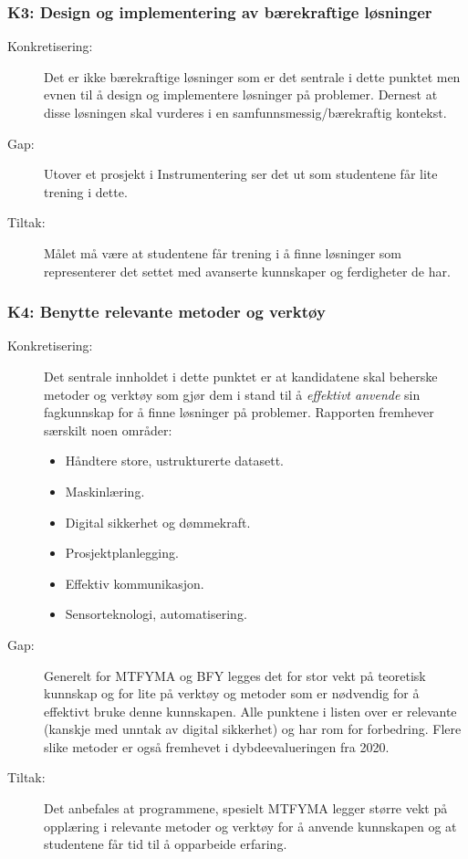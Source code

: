 \subsubsection{K3: Design og implementering av bærekraftige løsninger}
\begin{description}
\item[Konkretisering:]Det er ikke bærekraftige løsninger som er det sentrale i dette punktet men evnen til å design og implementere løsninger på problemer. Dernest at disse løsningen skal vurderes i en samfunnsmessig/bærekraftig kontekst.
\item[Gap:]Utover et prosjekt i Instrumentering ser det ut som studentene får lite trening i dette.
\item[Tiltak:]Målet må være at studentene får trening i å finne løsninger som representerer det settet med avanserte kunnskaper og ferdigheter de har.
\end{description}

\subsubsection{K4: Benytte relevante metoder og verktøy}
\begin{description}
\item[Konkretisering:] Det sentrale innholdet i dette punktet er at kandidatene skal beherske metoder og verktøy som gjør dem i stand til å \emph{effektivt anvende} sin fagkunnskap for å finne løsninger på problemer. Rapporten fremhever særskilt noen områder:
\begin{itemize}
	\item Håndtere store, ustrukturerte datasett.
	\item Maskinlæring.
	\item Digital sikkerhet og dømmekraft.
	\item Prosjektplanlegging.
	\item Effektiv kommunikasjon.
	\item Sensorteknologi, automatisering.
\end{itemize}

\item[Gap:]Generelt for MTFYMA og BFY legges det for stor vekt på teoretisk kunnskap og for lite på verktøy og metoder som er nødvendig for å effektivt bruke denne kunnskapen. Alle punktene i listen over er relevante (kanskje med unntak av digital sikkerhet) og har rom for forbedring. Flere slike metoder er også fremhevet i dybdeevalueringen fra 2020. 
\item[Tiltak:]Det anbefales at programmene, spesielt MTFYMA legger større vekt på opplæring i relevante metoder og verktøy for å anvende kunnskapen og at studentene får tid til å opparbeide erfaring.
\end{description}


